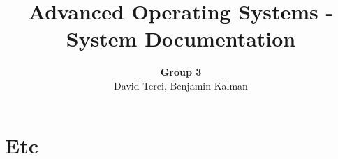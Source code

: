 \documentclass[12pt,english]{article}
\begin{document}

\title{Advanced Operating Systems - System Documentation}
\author{\textbf{Group 3} \\ David Terei, Benjamin Kalman}
\maketitle

\tableofcontents{}


\newpage{}
\section{Etc}
\end{document}
